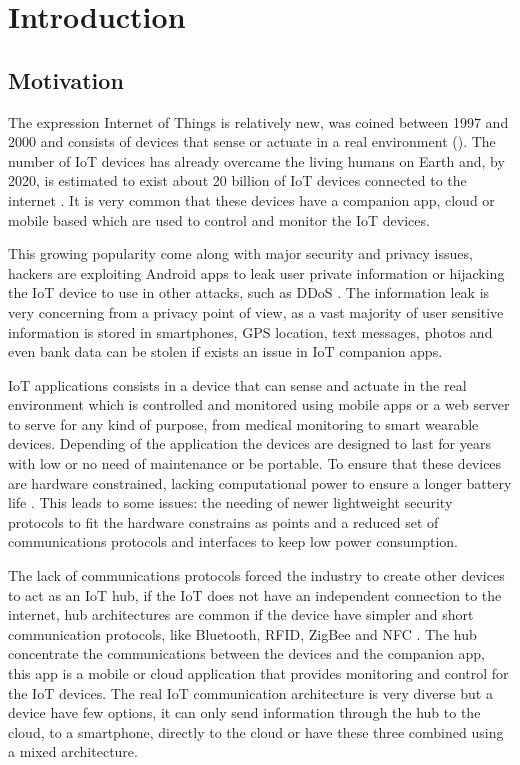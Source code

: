 \chapter{Introduction}

\section{Motivation}

The expression Internet of Things is relatively new, was coined between 1997 and 2000 and consists of devices that sense or actuate in a real environment (\cite{minerva2015towards}). The number of IoT devices has already overcame the living humans on Earth and, by 2020, is estimated to exist about 20 billion of IoT devices connected to the internet \citep{iotmarket}. It is very common that these devices have a companion app, cloud or mobile based which are used to control and monitor the IoT devices.

This growing popularity come along with major security and privacy issues, hackers are exploiting Android apps to leak user private information or hijacking the IoT device to use in other attacks, such as DDoS \citep{ycraig}. The information leak is very concerning from a privacy point of view, as a vast majority of user sensitive information is stored in smartphones, GPS location, text messages, photos and even bank data can be stolen if exists an issue in IoT companion apps.

IoT applications consists in a device that can sense and actuate in the real environment which is controlled and monitored using mobile apps or a web server to serve for any kind of purpose, from medical monitoring to smart wearable devices. Depending of the application the devices are designed to last for years with low or no need of maintenance or be portable. To ensure that these devices are hardware constrained, lacking computational power to ensure a longer battery life \citep{raj2017internet}. This leads to some issues: the needing of newer lightweight security protocols to fit the hardware constrains as \cite{zhang2014iot} points and a reduced set of communications protocols and interfaces to keep low power consumption.

The lack of communications protocols forced the industry to create other devices to act as an IoT hub, if the IoT does not have an independent connection to the internet, hub architectures are common if the device have simpler and short communication protocols, like Bluetooth, RFID, ZigBee and NFC \cite{al2017internet}. The hub concentrate the communications between the devices and the companion app, this app is a mobile or cloud application that provides monitoring and control for the IoT devices. The real IoT communication architecture is very diverse but a device have few options, it can only send information through the hub to the cloud, to a smartphone, directly to the cloud or have these three combined using a mixed architecture.

